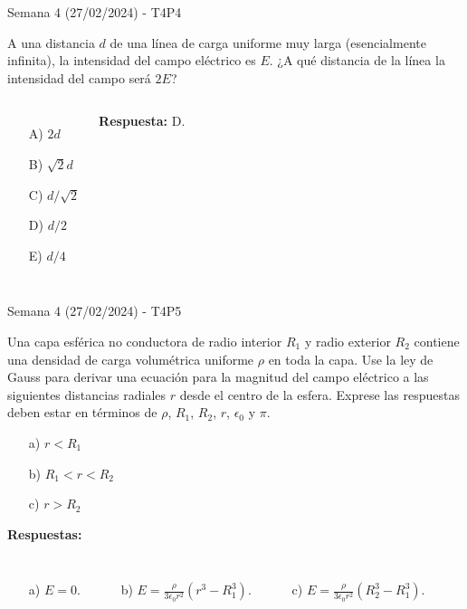 \begin{frame}{Semana 4 (27/02/2024) - T4P4}
    
    A una distancia $d$ de una línea de carga uniforme muy larga (esencialmente infinita), la intensidad del campo eléctrico es $E$. ¿A qué distancia de la línea la intensidad del campo será $2E$?
    
    \begin{columns}
    \begin{itemize}
        \item[A)] $2d$
        \item[B)] $\sqrt{2}d$
        \item[C)] $d/\sqrt{2}$
        \item[D)] $d/2$
        \item[E)] $d/4$
    \end{itemize}
    \pause\centering\textbf{Respuesta:} D.
    \end{columns}
    
\end{frame}

\begin{frame}{Semana 4 (27/02/2024) - T4P5}
    
    Una capa esférica no conductora de radio interior $R_1$ y radio exterior $R_2$ contiene una densidad de carga volum\'etrica uniforme $\rho$ en toda la capa. Use la ley de Gauss para derivar una ecuación para la magnitud del campo eléctrico a las siguientes distancias radiales $r$ desde el centro de la esfera. Exprese las respuestas deben estar en términos de $\rho$, $R_1$, $R_2$, $r$, $\epsilon_0$ y $\pi$.
    
    \begin{itemize}
        \item[a)] $r<R_1$
        \item[b)] $R_1<r<R_2$
        \item[c)] $r>R_2$
    \end{itemize}
    
    \pause\textbf{Respuestas:} 
    \begin{columns}
    \begin{itemize}
        \item[a)] $E=0$.
    \end{itemize}
    \begin{itemize}
        \item[b)] $E=\frac{\rho}{3\epsilon_0 r^2}\left(r^3-R_1^3\right)$.
    \end{itemize}
    \begin{itemize}
        \item[c)] $E=\frac{\rho}{3\epsilon_0 r^2}\left(R_2^3-R_1^3\right)$.
    \end{itemize}
    \end{columns}
    
\end{frame}

